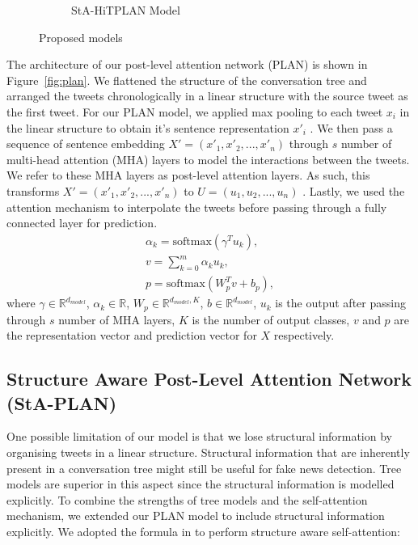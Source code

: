 \documentclass[letterpaper]{article} %
\begin{document}
\begin{figure}
\begin{subfigure}{0.5\columnwidth}
\caption{StA-HiTPLAN Model}
\label{fig:hierachical}
\end{subfigure}
\caption{Proposed models}
\end{figure}

The architecture of our post-level attention network (PLAN) is shown in Figure~\ref{fig:plan}. We flattened the structure of the conversation tree and arranged the tweets chronologically in a linear structure with the source tweet as the first tweet. For our PLAN model, we applied max pooling to each tweet $x_i$ in the linear structure to obtain it's sentence representation $x'_i$ . We then pass a sequence of sentence embedding $X' = (x'_{1} , x'_{2} , ..., x'_{n})$ through $s$ number of multi-head attention (MHA) layers to model the interactions between the tweets. We refer to these MHA layers as post-level attention layers. As such, this transforms $X' = (x'_{1}, x'_{2}, ..., x'_{n})$ to $U = (u_{1}, u_{2} , ..., u_{n})$ .
Lastly, we used the attention mechanism to interpolate the tweets before passing through a fully connected layer for prediction.
\begin{eqnarray}
\alpha_{k} = \mathrm{softmax}(\gamma^{T}u_{k}), \\
v = \sum_{k = 0}^{m} \alpha_{k}u_{k}, \\
p = \mathrm{softmax}(W_{p}^{T}v + b_{p}),
\end{eqnarray}
where $\gamma \in\mathbb{R}^{d_{model}}$, $\alpha_{k} \in\mathbb{R}$, $W_{p} \in\mathbb{R}^{d_{model}, K}$, $b \in\mathbb{R}^{d_{model}}$, $u_{k}$ is the output after passing through $s$ number of MHA layers, $K$ is the number of output classes, $v$ and $p$ are the representation vector and prediction vector for $X$ respectively.

\subsection{Structure Aware Post-Level Attention Network (StA-PLAN)}
\label{sec:staplan}

One possible limitation of our model is that we lose structural information by organising tweets in a linear structure. Structural information that are inherently present in a conversation tree might still be useful for fake news detection. Tree models are superior in this aspect since the structural information is modelled explicitly. To combine the strengths of tree models and the self-attention mechanism, we extended our PLAN model to include structural information explicitly. We adopted the formula in \citet{shaw-etal-2018-self} to perform structure aware self-attention:
\end{document}
